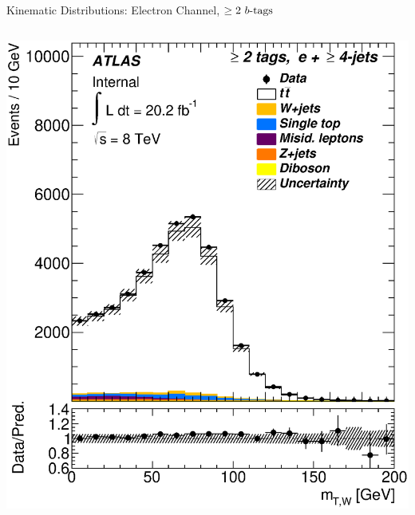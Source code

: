 \documentclass{beamer}
\begin{document}
{\begin{frame}{Kinematic Distributions: Electron Channel, $\geq2\text{ } \lowercase{ b\text{-tags}}$}
\begin{columns}
      \includegraphics[width=.95\textwidth]{../chapters/whel/figures/control_Plots2/bTag_2incl/TransverseMass_el}
    \end{columns}
  \end{frame}

}
\end{document}
